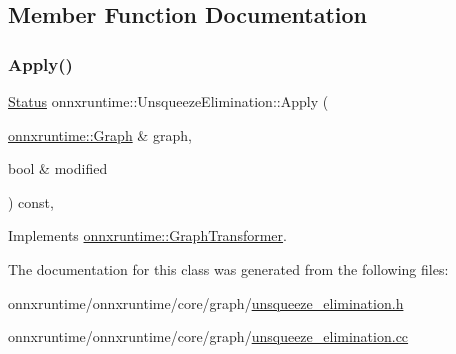 \subsection{Member Function Documentation}
\mbox{\label{classonnxruntime_1_1UnsqueezeElimination_afef298d0f56f50ee8b5336b103bbd96e}} 
\subsubsection{\texorpdfstring{Apply()}{Apply()}}
{\footnotesize\ttfamily \mbox{\hyperlink{classonnxruntime_1_1common_1_1Status}{Status}} onnxruntime\+::\+Unsqueeze\+Elimination\+::\+Apply (\begin{DoxyParamCaption}\item[{\mbox{\hyperlink{classonnxruntime_1_1Graph}{onnxruntime\+::\+Graph}} \&}]{graph,  }\item[{bool \&}]{modified }\end{DoxyParamCaption}) const\hspace{0.3cm}{\ttfamily [override]}, {\ttfamily [virtual]}}



Implements \mbox{\hyperlink{classonnxruntime_1_1GraphTransformer_a690d351da797884409b1d7aa584e33b5}{onnxruntime\+::\+Graph\+Transformer}}.



The documentation for this class was generated from the following files\+:\begin{DoxyCompactItemize}
\item 
onnxruntime/onnxruntime/core/graph/\mbox{\hyperlink{unsqueeze__elimination_8h}{unsqueeze\+\_\+elimination.\+h}}\item 
onnxruntime/onnxruntime/core/graph/\mbox{\hyperlink{unsqueeze__elimination_8cc}{unsqueeze\+\_\+elimination.\+cc}}\end{DoxyCompactItemize}
